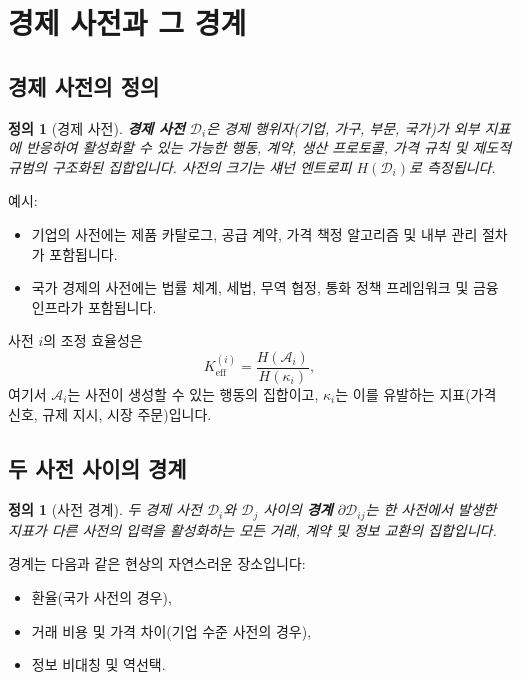 \documentclass[12pt,a4paper]{article}
\newtheorem{definition}[theorem]{정의}
\theoremstyle{remark}
\begin{document}
	\section{경제 사전과 그 경계}
	
	\subsection{경제 사전의 정의}
	
	\begin{definition}[경제 사전]
		\textbf{경제 사전} \(\mathcal{D}_i\)은 경제 행위자(기업, 가구, 부문, 국가)가 외부 지표에 반응하여 활성화할 수 있는 가능한 행동, 계약, 생산 프로토콜, 가격 규칙 및 제도적 규범의 구조화된 집합입니다. 사전의 크기는 섀넌 엔트로피 \(H(\mathcal{D}_i)\)로 측정됩니다.
	\end{definition}
	
	예시:
	\begin{itemize}
		\item 기업의 사전에는 제품 카탈로그, 공급 계약, 가격 책정 알고리즘 및 내부 관리 절차가 포함됩니다.
		\item 국가 경제의 사전에는 법률 체계, 세법, 무역 협정, 통화 정책 프레임워크 및 금융 인프라가 포함됩니다.
	\end{itemize}
	
	사전 \(i\)의 조정 효율성은
	\begin{equation}
		K_{\mathrm{eff}}^{(i)} = \frac{H(\mathcal{A}_i)}{H(\kappa_i)},
		\label{eq:keff_econ}
	\end{equation}
	여기서 \(\mathcal{A}_i\)는 사전이 생성할 수 있는 행동의 집합이고, \(\kappa_i\)는 이를 유발하는 지표(가격 신호, 규제 지시, 시장 주문)입니다.
	
	\subsection{두 사전 사이의 경계}
	
	\begin{definition}[사전 경계]
		두 경제 사전 \(\mathcal{D}_i\)와 \(\mathcal{D}_j\) 사이의 \textbf{경계} \(\partial\mathcal{D}_{ij}\)는 한 사전에서 발생한 지표가 다른 사전의 입력을 활성화하는 모든 거래, 계약 및 정보 교환의 집합입니다.
	\end{definition}
	
	경계는 다음과 같은 현상의 자연스러운 장소입니다:
	\begin{itemize}
		\item 환율(국가 사전의 경우),
		\item 거래 비용 및 가격 차이(기업 수준 사전의 경우),
		\item 정보 비대칭 및 역선택.
	\end{itemize}
	
\end{document}
